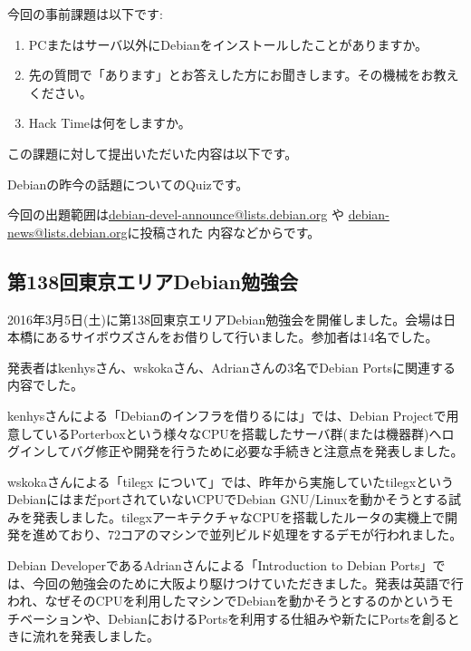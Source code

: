 \documentclass[mingoth,a4paper]{jsarticle}
\begin{document}

今回の事前課題は以下です:
\begin{enumerate}
\item PCまたはサーバ以外にDebianをインストールしたことがありますか。
\item 先の質問で「あります」とお答えした方にお聞きします。その機械をお教えください。
\item Hack Timeは何をしますか。
\end{enumerate}
この課題に対して提出いただいた内容は以下です。
\begin{multicols}{2}
{\small

}
\end{multicols}


Debianの昨今の話題についてのQuizです。

今回の出題範囲は\url{debian-devel-announce@lists.debian.org} や \url{debian-news@lists.debian.org}に投稿された
内容などからです。

\begin{multicols}{2}

\end{multicols}



\subsection{第138回東京エリアDebian勉強会}

2016年3月5日(土)に第138回東京エリアDebian勉強会を開催しました。会場は日本橋にあるサイボウズさんをお借りして行いました。参加者は14名でした。

発表者はkenhysさん、wskokaさん、Adrianさんの3名でDebian Portsに関連する内容でした。

kenhysさんによる「Debianのインフラを借りるには」では、Debian Projectで用意しているPorterboxという様々なCPUを搭載したサーバ群(または機器群)へログインしてバグ修正や開発を行うために必要な手続きと注意点を発表しました。

wskokaさんによる「tilegx について」では、昨年から実施していたtilegxというDebianにはまだportされていないCPUでDebian GNU/Linuxを動かそうとする試みを発表しました。tilegxアーキテクチャなCPUを搭載したルータの実機上で開発を進めており、72コアのマシンで並列ビルド処理をするデモが行われました。

Debian DeveloperであるAdrianさんによる「Introduction to Debian Ports」では、今回の勉強会のために大阪より駆けつけていただきました。発表は英語で行われ、なぜそのCPUを利用したマシンでDebianを動かそうとするのかというモチベーションや、DebianにおけるPortsを利用する仕組みや新たにPortsを創るときに流れを発表しました。
\end{document}
